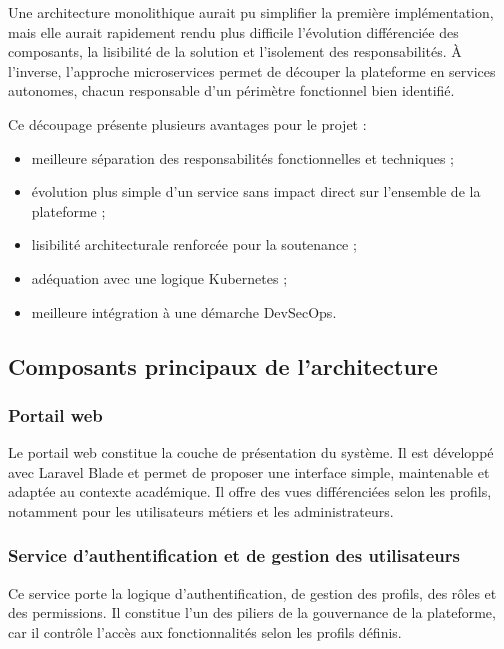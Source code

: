 Une architecture monolithique aurait pu simplifier la première implémentation, mais elle aurait rapidement rendu plus difficile l’évolution différenciée des composants, la lisibilité de la solution et l’isolement des responsabilités. À l’inverse, l’approche microservices permet de découper la plateforme en services autonomes, chacun responsable d’un périmètre fonctionnel bien identifié.

Ce découpage présente plusieurs avantages pour le projet :

\begin{itemize}
    \item meilleure séparation des responsabilités fonctionnelles et techniques ;
    \item évolution plus simple d’un service sans impact direct sur l’ensemble de la plateforme ;
    \item lisibilité architecturale renforcée pour la soutenance ;
    \item adéquation avec une logique Kubernetes ;
    \item meilleure intégration à une démarche DevSecOps.
\end{itemize}

\subsection{Composants principaux de l’architecture}

\subsubsection{Portail web}

Le portail web constitue la couche de présentation du système. Il est développé avec Laravel Blade et permet de proposer une interface simple, maintenable et adaptée au contexte académique. Il offre des vues différenciées selon les profils, notamment pour les utilisateurs métiers et les administrateurs.

\subsubsection{Service d’authentification et de gestion des utilisateurs}

Ce service porte la logique d’authentification, de gestion des profils, des rôles et des permissions. Il constitue l’un des piliers de la gouvernance de la plateforme, car il contrôle l’accès aux fonctionnalités selon les profils définis.

